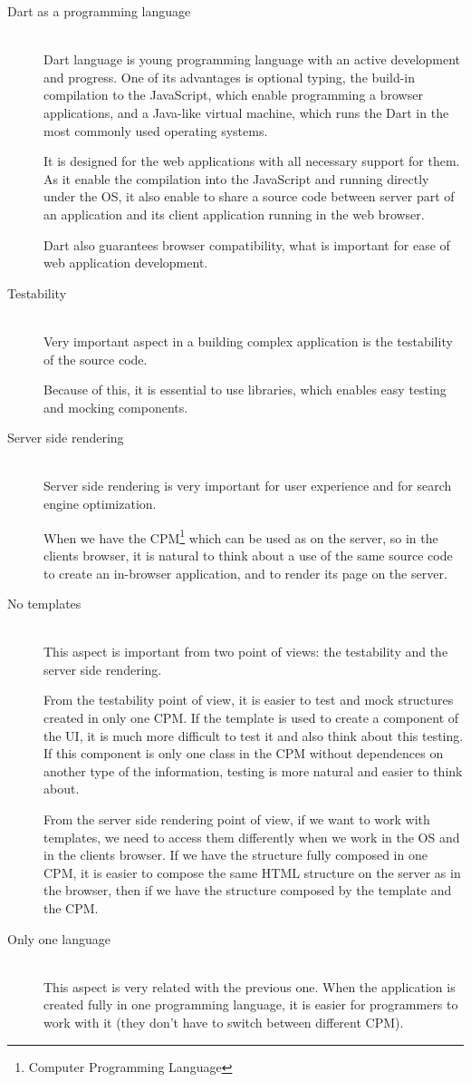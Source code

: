 \documentclass[oneside, 12pt]{book}
\begin{document}
\begin{description}
	\item[Dart as a programming language] \hfill \\
		Dart language is young programming language with an active development and progress. 
		One of its advantages is optional typing, 
		the build-in compilation to the JavaScript, which enable programming a browser applications,
		and a Java-like virtual machine, which runs the Dart in the most commonly used operating systems.

		It is designed for the web applications with all necessary support for them. 
		As it enable the compilation into the JavaScript and running directly under the OS, 
		it also enable to share a source code between server part of an application 
		and its client application running in the web browser.

		Dart also guarantees browser compatibility, what is important for ease of web application development.
	\item[Testability] \hfill \\
		Very important aspect in a building complex application is the testability of the source code.

		Because of this, it is essential to use libraries, which enables easy testing and mocking components.
	\item[Server side rendering] \hfill \\
		Server side rendering is very important for user experience and for search engine optimization. 

		When we have the CPM\footnote{Computer Programming Language} which can be used as on the server, so in the clients browser, 
		it is natural to think about a use of the same source code to create an in-browser application, 
		and to render its page on the server. 
	\item[No templates] \hfill \\
		This aspect is important from two point of views: the testability and the server side rendering.

		From the testability point of view, it is easier to test and mock structures created in only one CPM. 
		If the template is used to create a component of the UI, 
		it is much more difficult to test it and also think about this testing.
		If this component is only one class in the CPM without dependences on another type of the information, 
		testing is more natural and easier to think about.

		From the server side rendering point of view, if we want to work with templates, 
		we need to access them differently when we work in the OS and in the clients browser.
		If we have the structure fully composed in one CPM, it is easier to compose the same HTML structure on the server as in the browser, 
		then if we have the structure composed by the template and the CPM.
	\item[Only one language] \hfill \\
		This aspect is very related with the previous one. 
		When the application is created fully in one programming language, 
		it is easier for programmers to work with it (they don't have to switch between different CPM).


\end{description}
\end{document}
